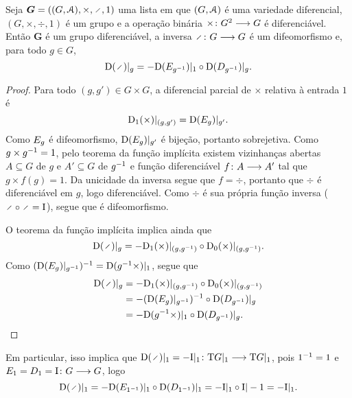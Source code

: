 \begin{proposition}
Seja $\bm G = ((G,\atlas),\times,\div,1)$ uma lista em que $(G,\mathcal{A})$ é uma variedade diferencial, $(G,\times,\div,1)$ é um grupo e a operação binária ${\times}\colon {G^2} \longrightarrow {G}$ é diferenciável. Então $\bm G$ é um grupo diferenciável, a inversa $\fun{\div}{G}{G}$ é um difeomorfismo e, para todo $g \in G$,
	\begin{equation*}
	\D (\div)|_g = - \D (\trE{g\inv})|_{1} \circ \D (\trD{g\inv})|_g.
	\end{equation*}
\end{proposition}
\begin{proof}
Para todo $(g,g') \in G \times G$, a diferencial parcial de $\times$ relativa à entrada $1$ é
	\begin{equation*}
	\mathrm{D}_1(\times)|_{(g,g')} = \mathrm{D} (E_{g})|_{g'}.
	\end{equation*}
Como $E_{g}$ é difeomorfismo, $\mathrm{D} (E_{g})|_{g'}$ é bijeção, portanto sobrejetiva. Como $g \times g^{-1} = 1$, pelo teorema da função implícita existem vizinhanças abertas $A \subseteq G$ de $g$ e $A' \subseteq G$ de $g^{-1}$ e função diferenciável ${f}\colon {A} \longrightarrow {A'}$ tal que $g \times f(g) = 1$. Da unicidade da inversa segue que $f=\div$, portanto que $\div$ é diferenciável em $g$, logo diferenciável. Como $\div$ é sua própria função inversa ($\div \circ \div = \Id$), segue que é difeomorfismo.

O teorema da função implícita implica ainda que
	\begin{equation*}
	\D(\div)|_g = - \D_1(\times)|_{(g,g\inv)} \circ \D_0(\times)|_{(g,g\inv)}.
	\end{equation*}
Como $(\mathrm{D} (E_{g})|_{g^{-1}})^{-1} = \mathrm{D} (g^{-1} \times)|_{1}$, segue que
	\begin{align*}
	\D(\div)|_g &= - \D_1(\times)|_{(g,g\inv)} \circ \D_0(\times)|_{(g,g\inv)} \\
		&= - (\D (\trE{g})|_{g\inv})\inv \circ \D (\trD{g\inv})|_{g} \\
		&= - \D (g\inv \times)|_{1} \circ \D (\trD{g\inv})|_g.
	\end{align*}
\end{proof}

Em particular, isso implica que $\D(\div)|_1 = \fun{-\Id|_1}{\Tg G|_1}{\Tg G|_1}$, pois $1^{-1}=1$ e $E_{1} = D_{1} = {\mathrm{I}}\colon {G} \longrightarrow {G}$, logo
	\begin{equation*}
	\D (\div)|_1 = - \D (\trE{1\inv})|_{1} \circ \D (\trD{1\inv})|_1 = -\Id|_1 \circ \Id|-1 = - \Id|_1.
	\end{equation*}




